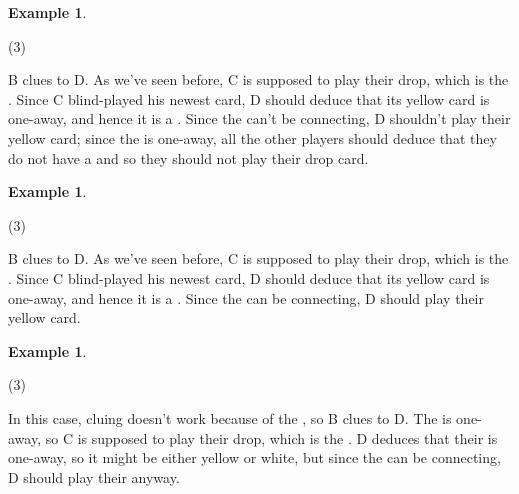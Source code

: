 \documentclass[a4paper]{article}
\theoremstyle{plain}
\theoremstyle{definition}
\newtheorem{example}[theorem]{Example}
\begin{document}
\begin{example}
	\label{ex:bluff}
	\hfill
	\begin{tasks}(3)
		\task[+]      
		\task[A]    
		\task[B]    
		\task[C]    
		\task[D]    
		\task[E]    
	\end{tasks}
	
	B clues  to D. As we've seen before, C is supposed to play their drop, which is the . Since C blind-played his newest card, D should deduce that its yellow card is one-away, and hence it is a . Since the  can't be connecting, D shouldn't play their yellow card; since the  is one-away, all the other players should deduce that they do not have a  and so they should not play their drop card.
\end{example}

\begin{example}
	\hfill
	\begin{tasks}(3)
		\task[+]      
		\task[A]    
		\task[B]    
		\task[C]    
		\task[D]    
		\task[E]    
	\end{tasks}
	
	B clues  to D. As we've seen before, C is supposed to play their drop, which is the . Since C blind-played his newest card, D should deduce that its yellow card is one-away, and hence it is a . Since the  can be connecting, D should play their yellow card.
\end{example}

\begin{example}
	\hfill
	\begin{tasks}(3)
		\task[+]      
		\task[A]    
		\task[B]    
		\task[C]    
		\task[D]    
		\task[E]    
	\end{tasks}
	
	In this case, cluing  doesn't work because of the , so B clues  to D. The  is one-away, so C is supposed to play their drop, which is the . D deduces that their  is one-away, so it might be either yellow or white, but since the  can be connecting, D should play their  anyway.
\end{example}
\end{document}
